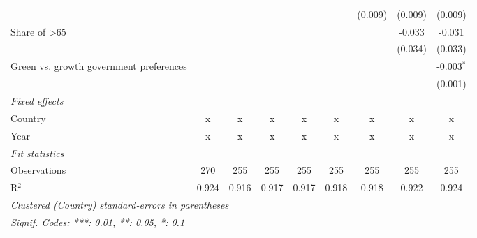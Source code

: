 \begin{table}[htbp]
\begin{tabular}{lcccccccc}
                                                       &         &         &         &         &         & (0.009) & (0.009) & (0.009)\\   
      Share of >65                                     &         &         &         &         &         &         & -0.033  & -0.031\\   
                                                       &         &         &         &         &         &         & (0.034) & (0.033)\\   
      Green vs. growth government preferences          &         &         &         &         &         &         &         & -0.003$^{*}$\\   
                                                       &         &         &         &         &         &         &         & (0.001)\\   
      \emph{Fixed effects}\\
      Country                                          & x       & x       & x       & x       & x       & x       & x       & x\\  
      Year                                             & x       & x       & x       & x       & x       & x       & x       & x\\  
      \midrule \emph{Fit statistics}\\
      Observations                                     & 270     & 255     & 255     & 255     & 255     & 255     & 255     & 255\\  
      R$^2$                                            & 0.924   & 0.916   & 0.917   & 0.917   & 0.918   & 0.918   & 0.922   & 0.924\\  
      \midrule
      \multicolumn{9}{l}{\emph{Clustered (Country) standard-errors in parentheses}}\\
      \multicolumn{9}{l}{\emph{Signif. Codes: ***: 0.01, **: 0.05, *: 0.1}}\\
   \end{tabular}
\end{table}


